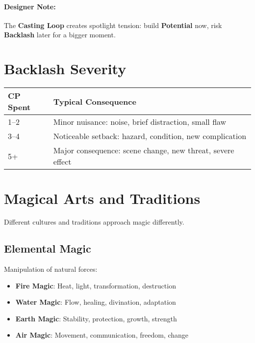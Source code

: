 \begin{multicols}{2}
\paragraph{Designer Note:}
The \textbf{Casting Loop} creates spotlight tension: build \textbf{Potential} now, risk \textbf{Backlash} later for a bigger moment.

\section{Backlash Severity} 

\begin{center}
\small
\begin{tabular}{ll}
\toprule
\textbf{CP Spent} & \textbf{Typical Consequence} \\
\midrule
1--2 & Minor nuisance: noise, brief distraction, small flaw \\
3--4 & Noticeable setback: hazard, condition, new complication \\
5+   & Major consequence: scene change, new threat, severe effect \\
\bottomrule
\end{tabular}
\end{center}

\section{Magical Arts and Traditions} 

Different cultures and traditions approach magic differently.

\subsection*{Elemental Magic} 
Manipulation of natural forces:
\begin{itemize}
\item \textbf{Fire Magic}: Heat, light, transformation, destruction
\item \textbf{Water Magic}: Flow, healing, divination, adaptation
\item \textbf{Earth Magic}: Stability, protection, growth, strength
\item \textbf{Air Magic}: Movement, communication, freedom, change
\end{itemize}


\end{multicols}
